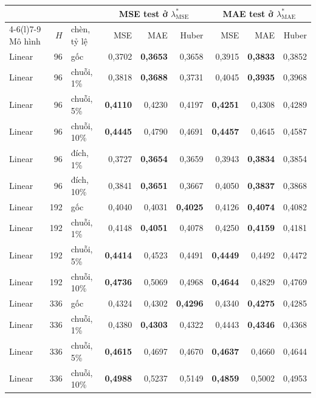 {\footnotesize
\begin{longtable}{@{}lr l rrr rrr@{}}
\toprule
 & & & \multicolumn{3}{c}{MSE test ở $\lambda^*_{\mathrm{MSE}}$} & \multicolumn{3}{c}{MAE test ở $\lambda^*_{\mathrm{MAE}}$} \\
\cmidrule(lr){4-6}\cmidrule(l){7-9}
Mô hình & $H$ & chèn, tỷ lệ & MSE & MAE & Huber & MSE & MAE & Huber \\
\midrule
\endhead
Linear & 96 & gốc & 0{,}3702 & \textbf{0{,}3653} & 0{,}3658 & 0{,}3915 & \textbf{0{,}3833} & 0{,}3852 \\
Linear & 96 & chuỗi, 1\% & 0{,}3818 & \textbf{0{,}3688} & 0{,}3731 & 0{,}4045 & \textbf{0{,}3935} & 0{,}3968 \\
Linear & 96 & chuỗi, 5\% & \textbf{0{,}4110} & 0{,}4230 & 0{,}4197 & \textbf{0{,}4251} & 0{,}4308 & 0{,}4289 \\
Linear & 96 & chuỗi, 10\% & \textbf{0{,}4445} & 0{,}4790 & 0{,}4691 & \textbf{0{,}4457} & 0{,}4645 & 0{,}4587 \\
Linear & 96 & đích, 1\% & 0{,}3727 & \textbf{0{,}3654} & 0{,}3659 & 0{,}3943 & \textbf{0{,}3834} & 0{,}3854 \\
Linear & 96 & đích, 10\% & 0{,}3841 & \textbf{0{,}3651} & 0{,}3667 & 0{,}4050 & \textbf{0{,}3837} & 0{,}3868 \\
\addlinespace[2pt]
Linear & 192 & gốc & 0{,}4040 & 0{,}4031 & \textbf{0{,}4025} & 0{,}4126 & \textbf{0{,}4074} & 0{,}4082 \\
Linear & 192 & chuỗi, 1\% & 0{,}4148 & \textbf{0{,}4051} & 0{,}4078 & 0{,}4250 & \textbf{0{,}4159} & 0{,}4181 \\
Linear & 192 & chuỗi, 5\% & \textbf{0{,}4414} & 0{,}4523 & 0{,}4491 & \textbf{0{,}4449} & 0{,}4492 & 0{,}4472 \\
Linear & 192 & chuỗi, 10\% & \textbf{0{,}4736} & 0{,}5069 & 0{,}4968 & \textbf{0{,}4644} & 0{,}4829 & 0{,}4769 \\
\addlinespace[2pt]
Linear & 336 & gốc & 0{,}4324 & 0{,}4302 & \textbf{0{,}4296} & 0{,}4340 & \textbf{0{,}4275} & 0{,}4285 \\
Linear & 336 & chuỗi, 1\% & 0{,}4380 & \textbf{0{,}4303} & 0{,}4322 & 0{,}4443 & \textbf{0{,}4346} & 0{,}4368 \\
Linear & 336 & chuỗi, 5\% & \textbf{0{,}4615} & 0{,}4697 & 0{,}4670 & \textbf{0{,}4637} & 0{,}4660 & 0{,}4644 \\
Linear & 336 & chuỗi, 10\% & \textbf{0{,}4988} & 0{,}5237 & 0{,}5149 & \textbf{0{,}4859} & 0{,}5002 & 0{,}4953 \\

\end{longtable}}
